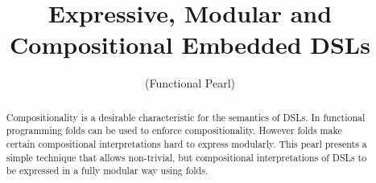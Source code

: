 \documentclass[nocopyrightspace]{sigplanconf}
\begin{document}
\setlength{\pdfpageheight}{\paperheight}
\setlength{\pdfpagewidth}{\paperwidth}






\title{Expressive, Modular and Compositional Embedded DSLs}
\subtitle{(Functional Pearl)}


           {}
           {}

\maketitle

\begin{abstract}
Compositionality is a desirable characteristic for the semantics of
DSLs. In functional programming folds can be used to enforce
compositionality. However folds make certain compositional
interpretations hard to express modularly. This pearl presents a
simple technique that allows non-trivial, but compositional
interpretations of DSLs to be expressed in a fully modular way
using folds.


\begin{comment}

This paper presents composable algebra with dependencies: a new approach to compose 
algebras together to allow dependent interpretations with {\em fold}. 
For a given datatype represented by two-level-types\cite{sheard04}, if one of its 
interpretations depends on a second one, we compose the algebra correponding 
to the first interpretation with the one corresponding to the second, and use the 
composed algebra with {\em fold} to evaluate the expression. We present our approach 
on top of the domain specific language for parallel prefix circuits.

\end{comment}

\end{abstract}
\end{document}
